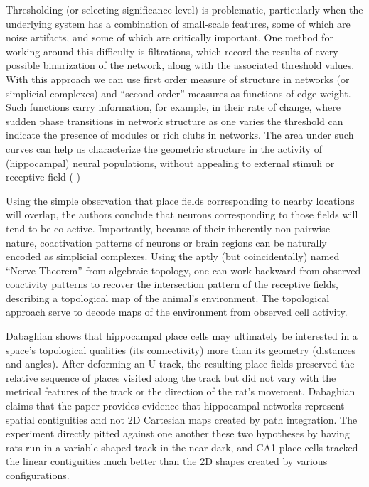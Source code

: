 \documentclass[onecollarge,runningheads]{svjour2}
\begin{document}
Thresholding (or selecting significance level) is problematic, particularly when the underlying system has a combination of small-scale features, some of which are noise artifacts, and some of which are critically important.  %
One method for working around this difficulty is filtrations, which record the results of every possible binarization of the network, along with the associated threshold values. With this approach we can use first order measure of structure in networks (or simplicial complexes) and  “second order” measures as functions of edge weight. Such functions carry information, for example, in their rate of change, where sudden phase transitions in network structure as one varies the threshold can indicate the presence of modules or rich clubs in networks. The area under such curves can help us characterize the geometric structure in the activity of (hippocampal) neural populations, without appealing to external stimuli or receptive field ( \citep{giusti2015clique})

Using the simple observation that place fields corresponding to nearby locations will overlap, the authors conclude that neurons corresponding to those fields will tend to be co-active. Importantly, because of their inherently non-pairwise nature, coactivation patterns of neurons or brain regions can be naturally encoded as simplicial complexes. 
Using the aptly (but coincidentally) named “Nerve Theorem” from algebraic topology, one can work backward from observed coactivity patterns to recover the intersection pattern of the receptive fields, describing a topological map of the animal’s environment.
The topological approach serve to decode maps of the environment from observed cell activity.

Dabaghian \citep{dabaghian2014reconceiving} shows that hippocampal place cells may ultimately be interested in a space's topological qualities (its connectivity) more than its geometry (distances and angles). After deforming an U track, the resulting place fields preserved the relative sequence of places visited along the track but did not vary with the metrical features of the track or the direction of the rat's movement.
Dabaghian claims that the paper provides evidence that hippocampal networks represent spatial contiguities and not 2D Cartesian maps created by path integration. The experiment directly pitted against one another these two hypotheses by having rats run in a variable shaped track in the near-dark, and CA1 place cells tracked the linear contiguities much better than the 2D shapes created by various configurations. 
\end{document}
